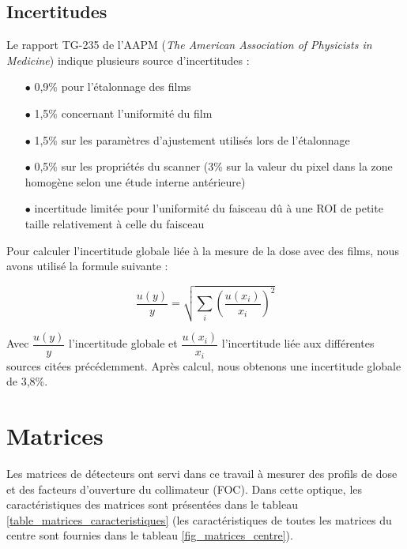 \documentclass{book}
\begin{document}
\subsection{Incertitudes}

Le rapport TG-235 de l'AAPM \cite{niroomand2020report} (\textit{The American Association of Physicists in Medicine}) indique plusieurs source d'incertitudes :

\begin{itemize}
  \item[$\bullet$] 0,9\% pour l'étalonnage des films
  \item[$\bullet$] 1,5\% concernant l'uniformité du film
  \item[$\bullet$] 1,5\% sur les paramètres d'ajustement utilisés lors de l'étalonnage
  \item[$\bullet$] 0,5\% sur les propriétés du scanner (3\% sur la valeur du pixel dans la zone homogène selon une étude interne antérieure)
  \item[$\bullet$] incertitude limitée pour l'uniformité du faisceau dû à une ROI de petite taille relativement à celle du faisceau
\end{itemize}

Pour calculer l'incertitude globale liée à la mesure de la dose avec des films, nous avons utilisé la formule suivante :

\begin{equation}
 \dfrac{u(y)}{y} = \sqrt{\sum\limits_i \left(\dfrac{u(x_i)}{x_i}\right)^2}
\end{equation}

Avec $\dfrac{u(y)}{y}$ l'incertitude globale et $\dfrac{u(x_i)}{x_i}$ l'incertitude liée aux différentes sources citées précédemment. Après calcul, nous obtenons une incertitude globale de 3,8\%.

\section{Matrices}

Les matrices de détecteurs ont servi dans ce travail à mesurer des profils de dose et des facteurs d'ouverture du collimateur (FOC). Dans cette optique, les caractéristiques des matrices sont présentées dans le tableau \ref*{table_matrices_caracteristiques} (les caractéristiques de toutes les matrices du centre sont fournies dans le tableau \ref*{fig_matrices_centre}).
\end{document}
